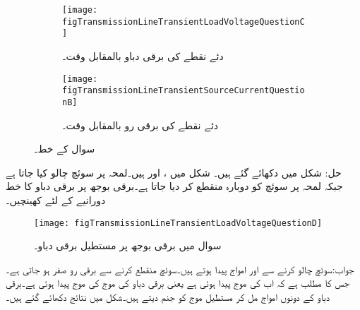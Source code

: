 \begin{figure}
\centering
\begin{subfigure}{0.8\textwidth}
\centering
\texttt{[image: figTransmissionLineTransientLoadVoltageQuestionC]}
\caption{ دئے نقطے کی برقی دباو بالمقابل وقت۔}
\label{شکل_ترسیلی_جواب_سوال_پ}
\end{subfigure}%

\begin{subfigure}{0.8\textwidth}
\centering
\texttt{[image: figTransmissionLineTransientSourceCurrentQuestionB]}
\caption{دئے نقطے کی برقی رو بالمقابل وقت۔}
\label{شکل_ترسیلی_جواب_منبع_رو_سوال_پ}
\end{subfigure}%
\caption{سوال  کے خط۔}
\label{شکل_سوال_ترسیلی_سوال_پ}
\end{figure}
حل: شکل   میں دکھائے گئے ہیں۔
شکل   میں  ،  اور  ہیں۔لمحہ  پر سوئچ چالو کیا جاتا ہے جبکہ لمحہ  پر سوئچ کو دوبارہ منقطع کر دیا جاتا ہے۔برقی بوجھ پر برقی دباو کا خط  دورانیے کے لئے کھینچیں۔
\begin{figure}
\centering
\texttt{[image: figTransmissionLineTransientLoadVoltageQuestionD]}
\caption{سوال  میں برقی بوجھ پر مستطیل برقی دباو۔}
\label{شکل_ترسیلی_سوال_مستطیل_دباو}
\end{figure}
جواب:سوئچ چالو کرنے سے  اور  امواج پیدا ہوتے ہیں۔سوئچ منقطع کرنے سے برقی رو صفر ہو جاتی ہے۔جس کا مطلب ہے کہ اب  کی موج پیدا ہوئی ہے یعنی برقی دباو کی موج  کی موج پیدا ہوئی ہے۔برقی دباو کے دونوں امواج مل کر مستطیل موج کو جنم دیتے ہیں۔شکل  میں نتائج دکھائے گئے ہیں۔

